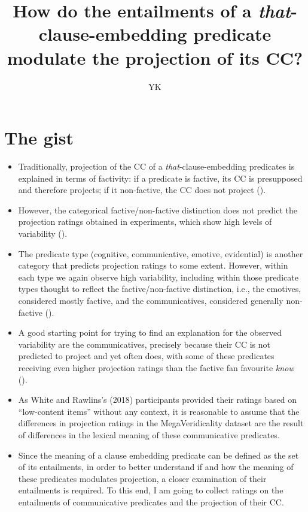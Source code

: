 \documentclass[11pt,fleqn]{article}
\title{How do the entailments of a \emph{that}-clause-embedding predicate modulate the projection of its CC?}
\author{YK}
\newcommand{\6}{\mbox{$[\hspace*{-.6mm}[$}}
\newcommand{\9}{\mbox{$]\hspace*{-.6mm}]$}}
\begin{document}
\maketitle

\section{The gist}
\begin{itemize}
\item Traditionally, projection of the CC of a \emph{that}-clause-embedding predicates is explained in terms of factivity: if a predicate is factive, its CC is presupposed and therefore projects; if it non-factive, the CC does not project (\citealt{kiparsky-kiparsky70}). 
\item However, the categorical factive/non-factive distinction does not predict the projection ratings obtained in experiments, which show high levels of variability (\citealt{degen-tonhauser-language}). 
\item The predicate type (cognitive, communicative, emotive, evidential) is another category that predicts projection ratings to some extent. However, within each type we again observe high variability, including within those predicate types thought to reflect the factive/non-factive distinction, i.e., the emotives, considered mostly factive, and the communicatives, considered generally non-factive (\citealt{anand-hacquard2014}).
\item A good starting point for trying to find an explanation for the observed variability are the communicatives, precisely because their CC is not predicted to project and yet often does, with some of these predicates receiving even higher projection ratings than the factive fan favourite \emph{know} (\citealt{white-rawlins-nels2018}). 
\item As White and Rawlins’s (2018) participants provided their ratings based on “low-content items” without any context, it is reasonable to assume that the differences in projection ratings in the MegaVeridicality dataset are the result of differences in the lexical meaning of these communicative predicates. 
\item Since the meaning of a clause embedding predicate can be defined as the set of its entailments, in order to better understand if and how the meaning of these predicates modulates projection, a closer examination of their entailments is required.
To this end, I am going to collect ratings on the entailments of communicative predicates and the projection of their CC.
\end{itemize}
\end{document}
